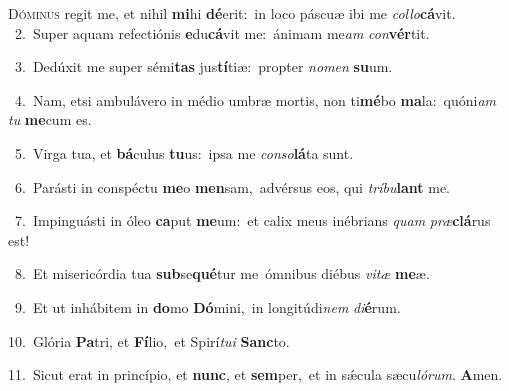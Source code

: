 \lettrine{\initial\textcolor{\initialcolor}{D}}{óminus} regit me, et nihil \textbf{mi}\-hi \textbf{dé}\-erit:~\star in loco páscuæ ibi me \textit{col}\-\textit{lo}\textbf{cá}vit.\\
{\numbfont\textcolor{\numbcolor}{~2.}}~Super aquam refectiónis \textbf{e}\-du\-\textbf{cá}\-vit me:~\star ánimam me\textit{am} \textit{con}\-\textbf{vér}tit.\par
{\numbfont\textcolor{\numbcolor}{~3.}}~Dedúxit me super sémi\textbf{tas} jus\-\textbf{tí}\-tiæ:~\star propter \textit{no}\-\textit{men} \textbf{su}\-um.\par
{\numbfont\textcolor{\numbcolor}{~4.}}~Nam, etsi ambulávero in médio umbræ mortis, non ti\-\textbf{mé}\-bo \textbf{ma}\-la:~\star quóni\textit{am} \textit{tu} \textbf{me}\-cum es.\par
{\numbfont\textcolor{\numbcolor}{~5.}}~Virga tua, et \textbf{bá}\-culus \textbf{tu}\-us:~\star ipsa me \textit{con}\-\textit{so}\textbf{lá}ta sunt.\par
{\numbfont\textcolor{\numbcolor}{~6.}}~Parásti in conspéctu \textbf{me}\-o \textbf{men}\-sam,~\star advérsus eos, qui \textit{trí}\-\textit{bu}\textbf{lant} me.\par
{\numbfont\textcolor{\numbcolor}{~7.}}~Impinguásti in óleo \textbf{ca}\-put \textbf{me}\-um:~\star et calix meus inébrians \textit{quam} \textit{præ}\-\textbf{clá}rus est!\par
{\numbfont\textcolor{\numbcolor}{~8.}}~Et misericórdia tua \textbf{sub}\-se\-\textbf{qué}\-tur me~\star ómnibus diébus \textit{vi}\-\textit{tæ} \textbf{me}\-æ.\par
{\numbfont\textcolor{\numbcolor}{~9.}}~Et ut inhábitem in \textbf{do}\-mo \textbf{Dó}\-mini,~\star in longitúdi\textit{nem} \textit{di}\-\textbf{é}rum.\par
{\numbfont\textcolor{\numbcolor}{10.}}~Glória \textbf{Pa}\-tri, et \textbf{Fí}\-lio,~\star et Spirí\-\textit{tu}\-\textit{i} \textbf{Sanc}\-to.\par
{\numbfont\textcolor{\numbcolor}{11.}}~Sicut erat in princípio, et \textbf{nunc}\-, et \textbf{sem}\-per,~\star et in sǽcula sæcu\-\textit{ló}\-\textit{rum}. \textbf{A}\-men.\par
